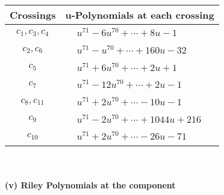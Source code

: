 \documentclass[1p]{elsarticle_modified}
\theoremstyle{definition}
\begin{document}
\begin{tabular}{m{50pt}|m{274pt}}
Crossings & \hspace{64pt}u-Polynomials at each crossing \\
\hline $$\begin{aligned}c_{1},c_{3},c_{4}\end{aligned}$$&$\begin{aligned}
&u^{71}-6 u^{70}+\cdots+8 u-1
\end{aligned}$\\
\hline $$\begin{aligned}c_{2},c_{6}\end{aligned}$$&$\begin{aligned}
&u^{71}- u^{70}+\cdots+160 u-32
\end{aligned}$\\
\hline $$\begin{aligned}c_{5}\end{aligned}$$&$\begin{aligned}
&u^{71}+6 u^{70}+\cdots+2 u+1
\end{aligned}$\\
\hline $$\begin{aligned}c_{7}\end{aligned}$$&$\begin{aligned}
&u^{71}-12 u^{70}+\cdots+2 u-1
\end{aligned}$\\
\hline $$\begin{aligned}c_{8},c_{11}\end{aligned}$$&$\begin{aligned}
&u^{71}+2 u^{70}+\cdots-10 u-1
\end{aligned}$\\
\hline $$\begin{aligned}c_{9}\end{aligned}$$&$\begin{aligned}
&u^{71}-2 u^{70}+\cdots+1044 u+216
\end{aligned}$\\
\hline $$\begin{aligned}c_{10}\end{aligned}$$&$\begin{aligned}
&u^{71}+2 u^{70}+\cdots-26 u-71
\end{aligned}$\\
\hline
\end{tabular}\\~\\
\newpage\renewcommand{\arraystretch}{1}
\flushleft \textbf{(v) Riley Polynomials at the component}\newline \\
\end{document}
